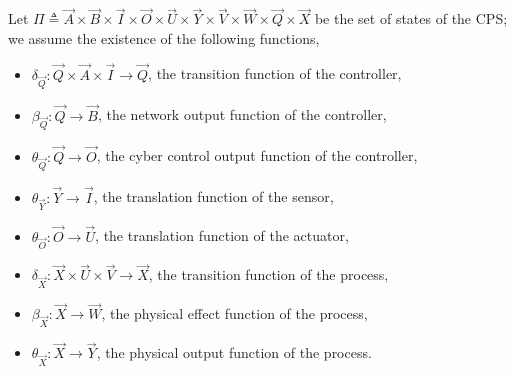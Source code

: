 {
\begin{definition}
\label{def:SingleCycleSemantics}
Let $\Pi\triangleq \vec{A}\times\vec{B}\times\vec{I}\times\vec{O}\times\vec{U}\times\vec{Y}\times\vec{V}\times\vec{W}\times\vec{Q}\times\vec{X}$ be the set of states of the CPS; we assume the existence of the following functions,
\begin{itemize}
\item $\delta_{\vec{Q}}\colon \vec{Q}\times \vec{A}\times \vec{I} \rightarrow \vec{Q}$, the transition function of the controller,
\item $\beta_{\vec{Q}}\colon \vec{Q}\rightarrow \vec{B}$, the network output function of the controller,
\item $\theta_{\vec{Q}}\colon \vec{Q}\rightarrow \vec{O}$, the cyber control output function of the controller,
\item $\theta_{\vec{Y}}\colon \vec{Y} \rightarrow \vec{I}$, the translation function of the sensor,
\item $\theta_{\vec{O}}\colon \vec{O} \rightarrow \vec{U}$, the translation function of the actuator,
\item $\delta_{\vec{X}}\colon \vec{X} \times \vec{U}\times \vec{V} \rightarrow \vec{X}$, the transition function of the process,
\item $\beta_{\vec{X}}\colon \vec{X}\rightarrow \vec{W}$, the physical effect function of the process,
\item $\theta_{\vec{X}}\colon \vec{X}\rightarrow \vec{Y}$, the physical output function of the process.
\end{itemize} 


\end{definition}}
